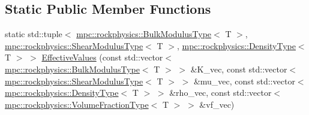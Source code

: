 \subsection*{Static Public Member Functions}
\begin{DoxyCompactItemize}
\item 
static std\+::tuple$<$ \mbox{\hyperlink{structmpc_1_1rockphysics_1_1_bulk_modulus_type}{mpc\+::rockphysics\+::\+Bulk\+Modulus\+Type}}$<$ T $>$, \mbox{\hyperlink{structmpc_1_1rockphysics_1_1_shear_modulus_type}{mpc\+::rockphysics\+::\+Shear\+Modulus\+Type}}$<$ T $>$, \mbox{\hyperlink{structmpc_1_1rockphysics_1_1_density_type}{mpc\+::rockphysics\+::\+Density\+Type}}$<$ T $>$ $>$ \mbox{\hyperlink{classmpc_1_1rockphysics_1_1_scalar_composites_base_aba66badee61db2667c488a71931da882}{Effective\+Values}} (const std\+::vector$<$ \mbox{\hyperlink{structmpc_1_1rockphysics_1_1_bulk_modulus_type}{mpc\+::rockphysics\+::\+Bulk\+Modulus\+Type}}$<$ T $>$ $>$ \&K\+\_\+vec, const std\+::vector$<$ \mbox{\hyperlink{structmpc_1_1rockphysics_1_1_shear_modulus_type}{mpc\+::rockphysics\+::\+Shear\+Modulus\+Type}}$<$ T $>$ $>$ \&mu\+\_\+vec, const std\+::vector$<$ \mbox{\hyperlink{structmpc_1_1rockphysics_1_1_density_type}{mpc\+::rockphysics\+::\+Density\+Type}}$<$ T $>$ $>$ \&rho\+\_\+vec, const std\+::vector$<$ \mbox{\hyperlink{structmpc_1_1rockphysics_1_1_volume_fraction_type}{mpc\+::rockphysics\+::\+Volume\+Fraction\+Type}}$<$ T $>$ $>$ \&vf\+\_\+vec)
\end{DoxyCompactItemize}
